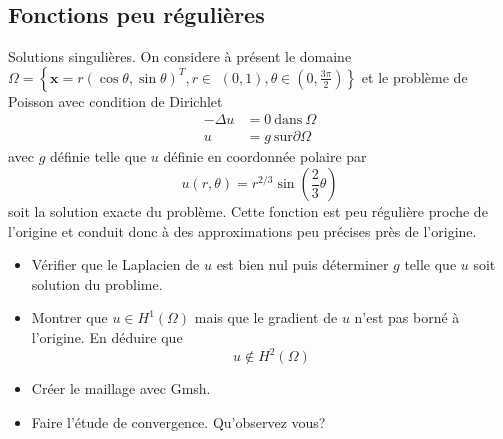 \documentclass[11pt,utf8]{article}
\begin{document}
\subsection{Fonctions peu régulières}
\label{sec:fonct-peu-regul}

Solutions singulières. On considere à présent le domaine $\Omega=\left\{\mathbf{x}=r(\cos \theta, \sin \theta)^{T}, r \in\right.$ $\left.(0,1), \theta \in\left(0, \frac{3 \pi}{2}\right)\right\}$ et le problème de Poisson avec condition de Dirichlet
  \begin{equation}
  \label{eq:1}
  \begin{split}
    -\Delta u &= 0\ \mbox{dans}\ \Omega\\
    u &= g\ \mbox{sur} \partial\Omega
  \end{split}
\end{equation}
avec $g$ définie telle que $u$ définie en coordonnée polaire par
$$
u(r, \theta)=r^{2 / 3} \sin \left(\frac{2}{3} \theta\right)
$$
soit la solution exacte du problème. Cette fonction est peu régulière proche de l'origine et conduit donc à des approximations peu précises près de l'origine.
\begin{itemize}
\item Vérifier que le Laplacien de $u$ est bien nul puis déterminer $g$ telle que $u$ soit solution du problime.
\item Montrer que $u \in H^{1}(\Omega)$ mais que le gradient de $u$ n'est pas borné à l'origine. En déduire que
$$
u \notin H^{2}(\Omega)
$$
\item  Créer le maillage avec Gmsh.
\item Faire l'étude de convergence. Qu'observez vous?
\end{itemize}
\end{document}
